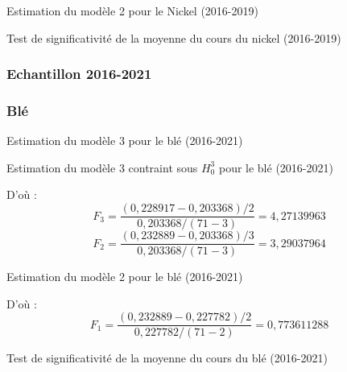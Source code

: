 \documentclass[12pt,a4paper]{article}
\begin{document}
\begin{table}[H]
    \centering
    \caption{Estimation du modèle 2 pour le Nickel (2016-2019)}
    \label{tab:mod2_nickel19}
    \sffamily
    \resizebox{0.8\textwidth}{!}{}
\end{table}

\begin{table}[H]
    \centering
    \caption{Test de significativité de la moyenne du cours du nickel (2016-2019)}
    \label{tab:testmoy_nickel19}
    \sffamily
    \resizebox{0.6\textwidth}{!}{}
\end{table}

\subsubsection{Echantillon 2016-2021}\label{appendix:ru_21}
\subsubsection*{Blé}
\begin{table}[H]
    \centering
    \caption{Estimation du modèle 3 pour le blé (2016-2021)}
    \label{tab:mod3_ble21}
    \sffamily
    \resizebox{0.8\textwidth}{!}{}
\end{table}

\begin{table}[H]
    \centering
    \caption{Estimation du modèle 3 contraint sous $H_{0}^{3}$ pour le blé (2016-2021)}
    \label{tab:mod3cont_ble21}
    \sffamily
    \resizebox{0.8\textwidth}{!}{}
\end{table}
D'où : 
\begin{equation*}
    F_{3} = \frac{(0,228917 -  0,203368)/2}{0,203368/(71-3)} = 4,27139963
\end{equation*}
\begin{equation*}
    F_{2} = \frac{(0,232889 -  0,203368)/3}{0,203368/(71-3)} = 3,29037964
\end{equation*}
\begin{table}[H]
    \centering
    \caption{Estimation du modèle 2 pour le blé (2016-2021)}
    \label{tab:mod2_ble21}
    \sffamily
    \resizebox{0.8\textwidth}{!}{}
\end{table}
D'où : 
\begin{equation*}
    F_{1} = \frac{(0,232889 -  0,227782)/2}{0,227782 /(71-2)} = 0,773611288
\end{equation*}
\begin{table}[H]
    \centering
    \caption{Test de significativité de la moyenne du cours du blé (2016-2021)}
    \label{tab:testmoy_ble21}
    \sffamily
    \resizebox{0.6\textwidth}{!}{}
\end{table}
\end{document}
